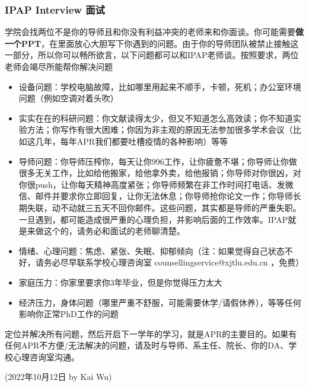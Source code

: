 \subsubsection{IPAP Interview 面试}
\label{section:IPAP}
学院会找两位不是你的导师且和你没有利益冲突的老师来和你面谈。你可能需要\textbf{做一个PPT}，在里面放心大胆写下你遇到的问题。由于你的导师团队被禁止接触这一部分，所以你可以畅所欲言，以下问题都可以和IPAP老师谈。按照要求，两位老师会竭尽所能帮你解决问题
\begin{itemize}
    \item 设备问题：学校电脑故障，比如哪里用起来不顺手，卡顿，死机；办公室环境问题（例如空调对着头吹）
    \item 实实在在的科研问题：你文献读得太少，但又不知道怎么高效读；你不知道实验方法；你写作有很大困难；你因为非主观的原因无法参加很多学术会议（比如这几年，每年APR我们都要吐槽疫情的各种影响）等等
    \item 导师问题：你导师压榨你，每天让你996工作，让你疲惫不堪；你导师让你做很多无关工作，比如给他搬家，给他拿外卖，给他报销；你导师对你很凶，对你很push，让你每天精神高度紧张；你导师频繁在非工作时间打电话、发微信、邮件并要求你立即回复，让你无法休息；你导师抢你论文一作；你导师长期失联，动不动就三五天不回你邮件。这些问题，其实都是导师的严重失职。一旦遇到，都可能造成很严重的心理负担，并影响后面的工作效率。IPAP就是来做这个的，请务必和面试的老师聊清楚。
    \item 情绪、心理问题：焦虑、紧张、失眠、抑郁倾向（注：如果觉得自己状态不好，请务必尽早联系学校心理咨询室 counsellingservice@xjtlu.edu.cn ，免费）
    \item 家庭压力：你家里要求你3年毕业，但是你觉得压力太大
    \item 经济压力，身体问题（哪里严重不舒服，可能需要休学/请假休养），等等任何影响你正常PhD工作的问题
\end{itemize}

\vspace{5mm}
定位并解决所有问题，然后开启下一学年的学习，就是APR的主要目的。如果有任何APR不方便/无法解决的问题，请及时与导师、系主任、院长、你的DA、学校心理咨询室沟通。


\begin{flushright}
(2022年10月12日 by Kai Wu)
\end{flushright}
